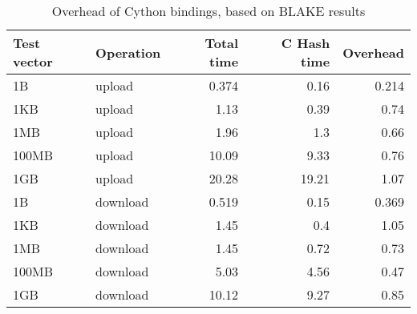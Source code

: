 \begin{table}
  \centering
  \begin{tabular}{ | l | l | r | r | r |}
    \hline
    \textbf{Test vector} & \textbf{Operation} & \textbf{Total time} & \textbf{C Hash time} & \textbf{Overhead} \\ \hline
    1B     &  upload    &  0.374  &  0.16   &  0.214   \\ \hline   
    1KB    &  upload    &  1.13   &  0.39   &  0.74    \\ \hline 
    1MB    &  upload    &  1.96   &  1.3    &  0.66    \\ \hline 
    100MB  &  upload    &  10.09  &  9.33   &  0.76    \\ \hline 
    1GB    &  upload    &  20.28  &  19.21  &  1.07    \\ \hline 
    1B     &  download  &  0.519  &  0.15   &  0.369   \\ \hline 
    1KB    &  download  &  1.45   &  0.4    &  1.05    \\ \hline 
    1MB    &  download  &  1.45   &  0.72   &  0.73    \\ \hline 
    100MB  &  download  &  5.03   &  4.56   &  0.47    \\ \hline 
    1GB    &  download  &  10.12  &  9.27   &  0.85    \\ \hline 
  \end{tabular}
  \caption{Overhead of Cython bindings, based on BLAKE results}
  \label{tbl:cython:overhead}
\end{table}

